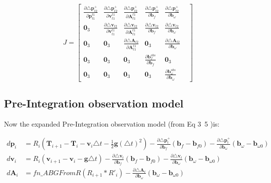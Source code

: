 \documentclass[12pt]{article}   %
\begin{document}
\begin{equation}[h!]
\label{eq:IJB}
J=\begin{bmatrix}
\frac{\partial { \triangle \bm{p}^+_{t2}}}{\partial \bm{p}^{t1}_{t1}}		&	
\frac{\partial { \triangle \bm{p}^+_{t2}}}{\partial \bm{v}^{t1}_{t1}}		& 
\frac{\partial { \triangle \bm{p}^+_{t2}}}{\partial \bm{A}^{t1}_{t1}}		&
\frac{\partial { \triangle \bm{p}^+_{t2}}}{\partial \bm{b}_{f}}		&
\frac{\partial { \triangle \bm{p}^+_{t2}}}{\partial \bm{b}_{\omega}}		\\
\bm{0}_3	&
\frac{\partial { \triangle \bm{v}_{t2}}}{\partial \bm{v}^{t1}_{t1}}		& 
\frac{\partial { \triangle \bm{v}_{t2}}}{\partial \bm{A}^{t1}_{t1}}		&
\frac{\partial { \triangle \bm{v}_{t2}}}{\partial \bm{b}_{f}}		&
\frac{\partial { \triangle \bm{v}_{t2}}}{\partial \bm{b}_{\omega}}		\\
\bm{0}_3	&
\bm{0}_3	&
\frac{\partial { \triangle \bm{A}_{t2}}}{\partial \bm{A}^{t1}_{t1}}		&
\bm{0}_3	&
\frac{\partial { \triangle \bm{A}_{t2}}}{\partial \bm{b}_{\omega}}		\\
\bm{0}_3	&
\bm{0}_3	&
\bm{0}_3	&
\frac{\partial { \bm{b}^{obs}_{f}}}{\partial \bm{b}_{f}}		&
\bm{0}_3	&		\\
\bm{0}_3	&
\bm{0}_3	&
\bm{0}_3	&
\bm{0}_3	&	
\frac{\partial { \bm{b}^{obs}_{\omega}}}{\partial \bm{b}_{\omega}}		&

\end{bmatrix}
\end{equation}

\subsection{Pre-Integration observation model}
Now the expanded Pre-Integration observation model (from Eq 3~5 )is:

\begin{align}
d\textbf{p}_i &= R_i (\textbf{T}_{i+1} - \textbf{T}_i - \textbf{v}_i \triangle t - \frac{1}{2} \textbf{g} {(\triangle t)}^2) - \frac{\partial \triangle \textbf{p}^+_t}{\partial \textbf{b}_f} (\textbf{b}_f - \textbf{b}_{f0}) -  \frac{\partial \triangle \textbf{p}^+_t}{\partial \textbf{b}_\omega} (\textbf{b}_\omega - \textbf{b}_{\omega0})\\
d\textbf{v}_i &= R_i (\textbf{v}_{i+1} - \textbf{v}_i - \textbf{g} \triangle t) - \frac{\partial \triangle \textbf{v}_t}{\partial \textbf{b}_f} (\textbf{b}_f - \textbf{b}_{f0}) -  \frac{\partial \triangle \textbf{v}_t}{\partial \textbf{b}_\omega} (\textbf{b}_\omega - \textbf{b}_{\omega0})\\
d\textbf{A}_i &= fn\_ABGFromR(R_{i+1}*R'_{i}) - \frac{\partial \triangle \textbf{A}_t}{\partial \textbf{b}_\omega} (\textbf{b}_\omega - \textbf{b}_{\omega0})
\end{align}
\end{document}

